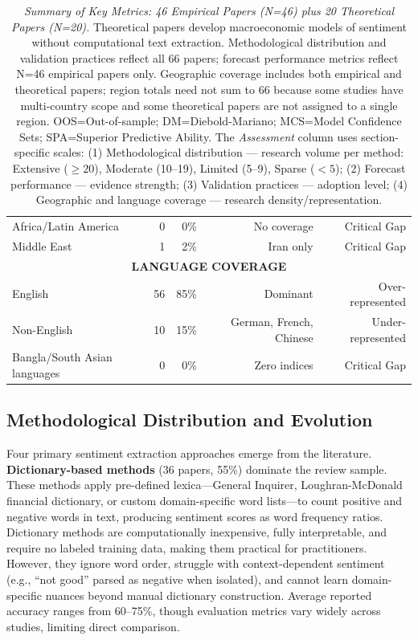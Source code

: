 \documentclass[11pt,twocolumn]{article}
\begin{document}
\begin{table}[htbp]
{\begin{tabular}{|l|r|r|r|r|}
Africa/Latin America & 0 & 0\% & No coverage & Critical Gap \\
Middle East & 1 & 2\% & Iran only & Critical Gap \\
\hline
\multicolumn{5}{|c|}{\textbf{LANGUAGE COVERAGE}} \\
\hline
English & 56 & 85\% & Dominant & Over-represented \\
Non-English & 10 & 15\% & German, French, Chinese & Under-represented \\
Bangla/South Asian languages & 0 & 0\% & Zero indices & Critical Gap \\
\hline
\end{tabular}
}%
\caption{\textit{Summary of Key Metrics: 46 Empirical Papers (N=46) plus 20 Theoretical Papers (N=20).} Theoretical papers develop macroeconomic models of sentiment without computational text extraction. Methodological distribution and validation practices reflect all 66 papers; forecast performance metrics reflect N=46 empirical papers only. Geographic coverage includes both empirical and theoretical papers; region totals need not sum to 66 because some studies have multi-country scope and some theoretical papers are not assigned to a single region. OOS=Out-of-sample; DM=Diebold-Mariano; MCS=Model Confidence Sets; SPA=Superior Predictive Ability. The \textit{Assessment} column uses section-specific scales: (1) Methodological distribution --- research volume per method: Extensive ($\geq 20$), Moderate (10--19), Limited (5--9), Sparse ($<5$); (2) Forecast performance --- evidence strength; (3) Validation practices --- adoption level; (4) Geographic and language coverage --- research density/representation.}
\label{tab:metasummary}
\end{table}

\subsection{Methodological Distribution and Evolution}

Four primary sentiment extraction approaches emerge from the literature. \textbf{Dictionary-based methods} (36 papers, 55\%) dominate the review sample. These methods apply pre-defined lexica---General Inquirer, Loughran-McDonald financial dictionary, or custom domain-specific word lists---to count positive and negative words in text, producing sentiment scores as word frequency ratios. Dictionary methods are computationally inexpensive, fully interpretable, and require no labeled training data, making them practical for practitioners. However, they ignore word order, struggle with context-dependent sentiment (e.g., ``not good'' parsed as negative when isolated), and cannot learn domain-specific nuances beyond manual dictionary construction. Average reported accuracy ranges from 60--75\%, though evaluation metrics vary widely across studies, limiting direct comparison.
\end{document}
